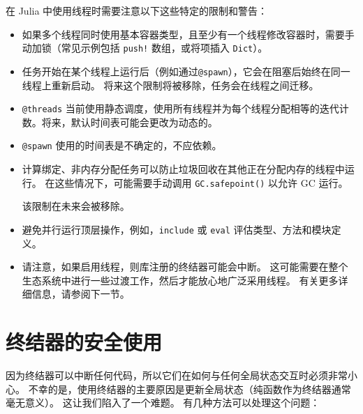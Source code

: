 在 Julia 中使用线程时需要注意以下这些特定的限制和警告：



\begin{itemize}
\item 如果多个线程同时使用基本容器类型，且至少有一个线程修改容器时，需要手动加锁（常见示例包括 \texttt{push!} 数组，或将项插入 \texttt{Dict}）。


\item 任务开始在某个线程上运行后（例如通过\texttt{@spawn}），它会在阻塞后始终在同一线程上重新启动。 将来这个限制将被移除，任务会在线程之间迁移。


\item \texttt{@threads} 当前使用静态调度，使用所有线程并为每个线程分配相等的迭代计数。将来，默认时间表可能会更改为动态的。


\item \texttt{@spawn} 使用的时间表是不确定的，不应依赖。


\item 计算绑定、非内存分配任务可以防止垃圾回收在其他正在分配内存的线程中运行。 在这些情况下，可能需要手动调用 \texttt{GC.safepoint()} 以允许 GC 运行。

该限制在未来会被移除。


\item 避免并行运行顶层操作，例如，\texttt{include} 或 \texttt{eval} 评估类型、方法和模块定义。


\item 请注意，如果启用线程，则库注册的终结器可能会中断。 这可能需要在整个生态系统中进行一些过渡工作，然后才能放心地广泛采用线程。 有关更多详细信息，请参阅下一节。

\end{itemize}


\hypertarget{16021882968975399694}{}


\section{终结器的安全使用}



因为终结器可以中断任何代码，所以它们在如何与任何全局状态交互时必须非常小心。 不幸的是，使用终结器的主要原因是更新全局状态（纯函数作为终结器通常毫无意义）。 这让我们陷入了一个难题。 有几种方法可以处理这个问题：



